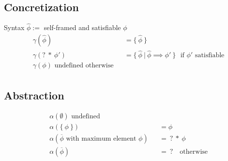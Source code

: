 \documentclass[11pt,a4paper]{article}
\begin{document}
\subsection{Concretization}
Syntax $\hat{\phi} := $ self-framed and satisfiable $\phi$
\begin{align*}
&\gamma(\hat{\phi}) ~&&= \{~ \hat{\phi} ~\} \\
&\gamma(?\:*\:\phi') ~&&= \{~ \hat{\phi} ~|~ \hat{\phi} \implies \phi' ~\} \text{~~if $\phi'$ satisfiable} \\
&\gamma(\phi) \text{ undefined otherwise} \\
\end{align*}

\subsection{Abstraction}
\begin{align*}
&\alpha(\emptyset) \text{ undefined} \\
&\alpha(\{~ \phi ~\}) &&= \phi \\
&\alpha(\overline{\phi} \text{ with maximum element } \phi) &&=~ ?\:*\:\phi \\
&\alpha(\overline{\phi}) &&=~ ? \text{~~~otherwise} \\
\end{align*}





\end{document}
